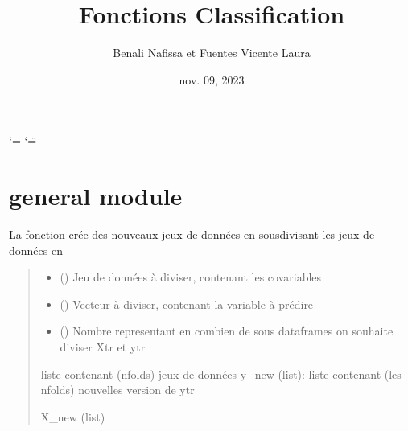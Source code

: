 \documentclass[letterpaper,10pt,french]{sphinxmanual}
\title{Fonctions Classification}
\date{nov. 09, 2023}
\author{Benali Nafissa et Fuentes Vicente Laura}
\begin{document}
\ifdefined\shorthandoff
  \ifnum\catcode`\=\string=\active\shorthandoff{=}\fi
  \ifnum\catcode`\"=\active{}\fi
\fi

\pagestyle{empty}
\sphinxmaketitle
\pagestyle{plain}
\sphinxtableofcontents
\pagestyle{normal}
\label{\detokenize{index::doc}}


\sphinxstepscope


\chapter{general module}
\label{\detokenize{general:module-general}}\label{\detokenize{general:general-module}}\label{\detokenize{general::doc}}

\begin{fulllineitems}
\label{\detokenize{general:general.CV_rep}}
\pysigstartsignatures
{}
\pysigstopsignatures
\sphinxAtStartPar
La fonction crée des nouveaux jeux de données en sous\sphinxhyphen{}divisant les jeux de données en
\begin{quote}\begin{description}
\begin{itemize}
\item {} 
\sphinxAtStartPar
{} () \textendash{} Jeu de données à diviser, contenant les co\sphinxhyphen{}variables

\item {} 
\sphinxAtStartPar
{} () \textendash{} Vecteur à diviser, contenant la variable à prédire

\item {} 
\sphinxAtStartPar
{} () \textendash{} Nombre representant en combien de sous dataframes on souhaite diviser Xtr et ytr

\end{itemize}

\sphinxAtStartPar
liste contenant (n\sphinxhyphen{}folds) jeux de données
y\_new (list): liste contenant (les n\sphinxhyphen{}folds) nouvelles version de ytr

\sphinxAtStartPar
X\_new (list)

\end{description}\end{quote}

\end{fulllineitems}
\end{document}
